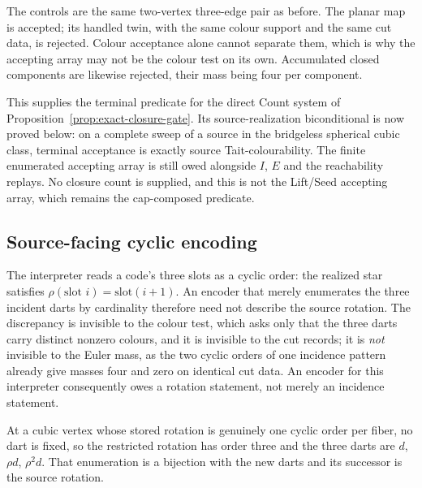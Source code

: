 The controls are the same two-vertex three-edge pair as before. The planar
map is accepted; its handled twin, with the same colour support and the same
cut data, is rejected. Colour acceptance alone cannot separate them, which is
why the accepting array may not be the colour test on its own. Accumulated
closed components are likewise rejected, their mass being four per component.

This supplies the terminal predicate for the direct Count system of
Proposition~\ref{prop:exact-closure-gate}. Its source-realization
biconditional is now proved below: on a complete sweep of a source in the
bridgeless spherical cubic class, terminal acceptance is exactly source
Tait-colourability. The finite enumerated accepting array is still owed
alongside $I$, $E$ and the reachability replays. No closure count is supplied,
and this is not the Lift/Seed accepting array, which remains the cap-composed
predicate.

\subsection{Source-facing cyclic encoding}
\label{sec:source-facing-cyclic-encoding}

The interpreter reads a code's three slots as a cyclic order: the realized
star satisfies $\rho(\text{slot }i)=\text{slot}(i+1)$. An encoder that merely
enumerates the three incident darts by cardinality therefore need not
describe the source rotation. The discrepancy is invisible to the colour
test, which asks only that the three darts carry distinct nonzero colours,
and it is invisible to the cut records; it is \emph{not} invisible to the
Euler mass, as the two cyclic orders of one incidence pattern already give
masses four and zero on identical cut data. An encoder for this interpreter
consequently owes a rotation statement, not merely an incidence statement.

At a cubic vertex whose stored rotation is genuinely one cyclic order per
fiber, no dart is fixed, so the restricted rotation has order three and the
three darts are $d$, $\rho d$, $\rho^{2}d$. That enumeration is a bijection
with the new darts and its successor is the source rotation.

